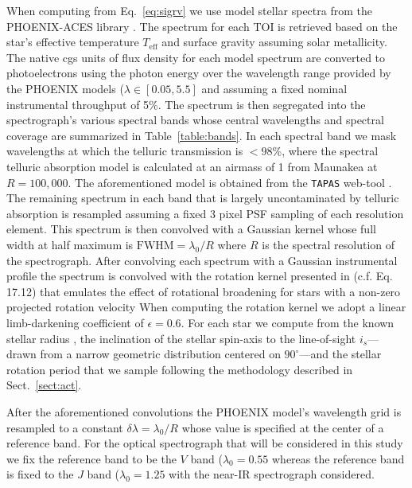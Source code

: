 When computing \sigRV{} from Eq.~\ref{eq:sigrv}
we use model stellar spectra from the PHOENIX-ACES library \citep{husser13}.
The spectrum for each TOI is retrieved based on the star's effective temperature $T_{\text{eff}}$ and 
surface gravity 
assuming solar metallicity. The native cgs units of flux density for each model spectrum
are converted to photoelectrons using the photon energy over the wavelength range provided by the
PHOENIX models ($\lambda \in [0.05,5.5]$ \micron{)} and assuming a fixed nominal
instrumental throughput of 5\%.
The spectrum is then segregated into the spectrograph's various spectral bands whose central wavelengths
and spectral coverage are summarized in Table~\ref{table:bands}. In each spectral band we mask
wavelengths at which the telluric transmission is $< 98$\%, where the
spectral telluric absorption model is calculated at an airmass of 1 from Maunakea at $R=100,000$.
The aforementioned model is obtained from the \texttt{TAPAS} web-tool \citep{bertaux14}.
The remaining spectrum in each band that is largely uncontaminated by telluric absorption
is resampled assuming a fixed 3 pixel PSF sampling of each resolution element.
This spectrum is then convolved with a Gaussian kernel whose full width at half maximum is
$\text{FWHM} = \lambda_0 / R$ where $R$ is the spectral resolution of the spectrograph.
After convolving each spectrum with a Gaussian instrumental profile
the spectrum is convolved with the rotation kernel presented in \cite{gray08}
(c.f. Eq. 17.12) that emulates
the effect of rotational broadening for stars with a non-zero projected rotation velocity 
When computing the rotation kernel we adopt a linear limb-darkening coefficient of $\epsilon=0.6$.
For each star we compute \vsini{} from the known stellar radius , the
inclination of the stellar spin-axis to the line-of-sight $i_s$---drawn from a narrow geometric
distribution centered on $90^{\circ}$---and the stellar rotation period \prot{,} 
that we sample following the methodology described in Sect.~\ref{sect:act}.



After the aforementioned convolutions the PHOENIX model's wavelength grid is resampled to a
constant $\delta \lambda = \lambda_0 / R$ whose value is specified at the center of a reference band.
For the optical spectrograph that will be considered in this study we fix the reference band to be
the $V$ band ($\lambda_0 = 0.55$ \micron{)} whereas the reference band is fixed to the $J$ band
($\lambda_0 = 1.25$ \micron{)} with the near-IR spectrograph considered.

